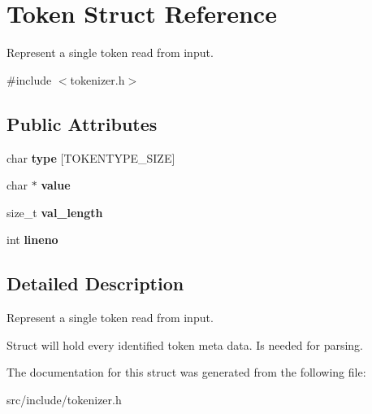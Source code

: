 \hypertarget{struct_token}{}\section{Token Struct Reference}
\label{struct_token}


Represent a single token read from input.  




{\ttfamily \#include $<$tokenizer.\+h$>$}

\subsection*{Public Attributes}
\begin{DoxyCompactItemize}
\item 
\mbox{\label{struct_token_a8ce1465ae45fecb9798e5cfb8c8b2165}} 
char {\bfseries type} \mbox{[}T\+O\+K\+E\+N\+T\+Y\+P\+E\+\_\+\+S\+I\+ZE\mbox{]}
\item 
\mbox{\label{struct_token_a2a240c7e82be05331fbe8acc2b774955}} 
char $\ast$ {\bfseries value}
\item 
\mbox{\label{struct_token_a73113624d32945da98d535efe8cea42a}} 
size\+\_\+t {\bfseries val\+\_\+length}
\item 
\mbox{\label{struct_token_ac27f35dabf992e05899db84ee4c132cb}} 
int {\bfseries lineno}
\end{DoxyCompactItemize}


\subsection{Detailed Description}
Represent a single token read from input. 

Struct will hold every identified token meta data. Is needed for parsing. 

The documentation for this struct was generated from the following file\+:\begin{DoxyCompactItemize}
\item 
src/include/tokenizer.\+h\end{DoxyCompactItemize}
